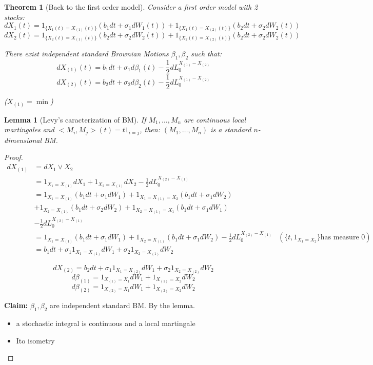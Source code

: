 \documentclass{article} \usepackage[utf8]{inputenc}
\newtheorem{theorem}{Theorem}
\newtheorem{lemma}{Lemma}
\begin{document}
  \begin{theorem}[Back to the first order model]
    Consider a first order model with 2 stocks:
    $$dX_1(t) = 1_{\{X_1(t) = X_{(1)}(t)\}} (b_1 dt+ \sigma_1 dW_1(t)) + 1_{\{X_1(t) = X_{(2)}(t)\}} (b_2 dt+ \sigma_2 dW_2(t))$$
    $$dX_2(t) = 1_{\{X_2(t) = X_{(1)}(t)\}} (b_2 dt+ \sigma_2 dW_2(t)) + 1_{\{X_2(t) = X_{(2)}(t)\}} (b_2 dt+ \sigma_2 dW_2(t))$$

    There exist independent standard Brownian Motions $\beta_1, \beta_2$ such that:
    $$dX_{(1)}(t) = b_1 dt + \sigma_1 d\beta_1(t) - \frac12 dL_0^{X_{(1)}-X_{(2)}}$$
    $$dX_{(2)}(t) = b_2 dt + \sigma_2 d\beta_2(t) - \frac12 dL_0^{X_{(1)}-X_{(2)}}$$

    ($X_{(1)} = \min$)
  \end{theorem}
  \begin{lemma}[Levy's caracterization of BM]
    If $M_1, \ldots, M_n$ are continuous local martingales and $<M_i, M_j>(t) = t 1_{i = j}$, then:
    $(M_1, \ldots, M_n)$ is a standard $n$-dimensional BM.
  \end{lemma}
  \begin{proof}
    \begin{align*}
      d X_{(1)}  &= d X_1 \vee X_2 \\
                 &= 1_{X_1 = X_{(1)}} dX_1 + 1_{X_2 = X_{(1)}} dX_2 - \frac12 dL_0^{X_{(2)} - X_{(1)}}\\
                 &= 1_{X_1 = X_{(1)}} (b_1 dt + \sigma_1 dW_1) + 1_{X_1 = X_{(1)} = X_2} (b_1 dt + \sigma_1 dW_2)
      \\&+ 1_{X_2 = X_{(1)}} (b_1 dt + \sigma_2 dW_2) + 1_{X_2 = X_{(1)} = X_1} (b_1 dt + \sigma_1 dW_1)
      \\&- \frac12 dL_0^{X_{(2)} - X_{(1)}}
      \\&= 1_{X_1 = X_{(1)}} (b_1 dt + \sigma_1 dW_1) + 1_{X_2 = X_{(1)}} (b_1 dt + \sigma_1 dW_2) - \frac12 dL_0^{X_{(2)} - X_{(1)}}
                 &(\{ t, 1_{X_1 = X_2}\} \text{has measure 0})
      \\&= b_1 dt + \sigma_1 1_{X_1 = X_{(1)}} dW_1 + \sigma_2 1_{X_2 = X_{(1)}} dW_2
    \end{align*}

    $$dX_{(2)} = b_2 dt + \sigma_1 1_{X_1 = X_{(2)}} dW_1 + \sigma_2 1_{X_2 = X_{(2)}} dW_2 $$
    $$d\beta_{(1)} = 1_{X_{(1)} = X_1} dW_1 + 1_{X_{(1)} = X_2} dW_2$$
    $$d\beta_{(2)} = 1_{X_{(2)} = X_1} dW_1 + 1_{X_{(2)} = X_2} dW_2$$
    
    \textbf{Claim:} $\beta_1, \beta_2$ are independent standard BM. By the lemma. 
    \begin{itemize}
    \item a stochastic integral is continuous and a local martingale
    \item Ito isometry
    \end{itemize}
  \end{proof}
\end{document}
